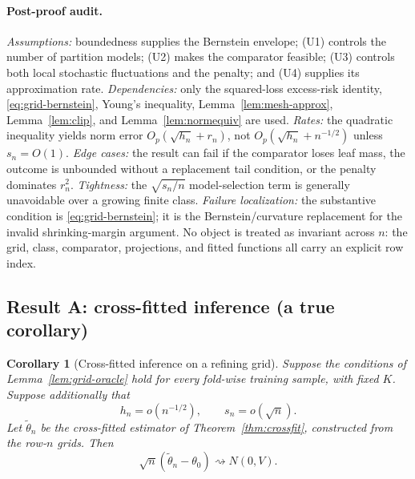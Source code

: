 \documentclass[11pt]{article}
\theoremstyle{plain}
\newtheorem{corollary}[theorem]{Corollary}
\theoremstyle{definition}
\theoremstyle{remark}
\newcommand{\thetatil}{\widetilde{\theta}}
\begin{document}
\paragraph{Post-proof audit.}
\emph{Assumptions:} boundedness supplies the Bernstein envelope; (U1)
controls the number of partition models; (U2) makes the comparator
feasible; (U3) controls both local stochastic fluctuations and the
penalty; and (U4) supplies its approximation rate.
\emph{Dependencies:} only the squared-loss excess-risk identity,
\eqref{eq:grid-bernstein}, Young's inequality, Lemma~\ref{lem:mesh-approx},
Lemma~\ref{lem:clip}, and Lemma~\ref{lem:normequiv} are used.
\emph{Rates:} the quadratic inequality yields norm error
$O_p(\sqrt{h_n}+r_n)$, not $O_p(\sqrt{h_n}+n^{-1/2})$ unless $s_n=O(1)$.
\emph{Edge cases:} the result can fail if the comparator loses leaf mass,
the outcome is unbounded without a replacement tail condition, or the
penalty dominates $r_n^2$.
\emph{Tightness:} the $\sqrt{s_n/n}$ model-selection term is generally
unavoidable over a growing finite class.
\emph{Failure localization:} the substantive condition is
\eqref{eq:grid-bernstein}; it is the Bernstein/curvature replacement for the
invalid shrinking-margin argument. No object is treated as invariant across
$n$: the grid, class, comparator, projections, and fitted functions all
carry an explicit row index.

\subsection{Result A: cross-fitted inference (a true corollary)}\label{sec:result-a}

\begin{corollary}[Cross-fitted inference on a refining grid]
\label{cor:grid-crossfit}
Suppose the conditions of Lemma~\ref{lem:grid-oracle} hold for every
fold-wise training sample, with fixed $K$. Suppose additionally that
\begin{equation}
  h_n=o(n^{-1/2}),
  \qquad
  s_n=o(\sqrt n).
  \label{eq:grid-rootn}
\end{equation}
Let $\thetatil_n$ be the cross-fitted estimator of Theorem~\ref{thm:crossfit},
constructed from the row-$n$ grids. Then
\[
  \sqrt n(\thetatil_n-\theta_0)\rightsquigarrow N(0,V).
\]
\end{corollary}
\end{document}
